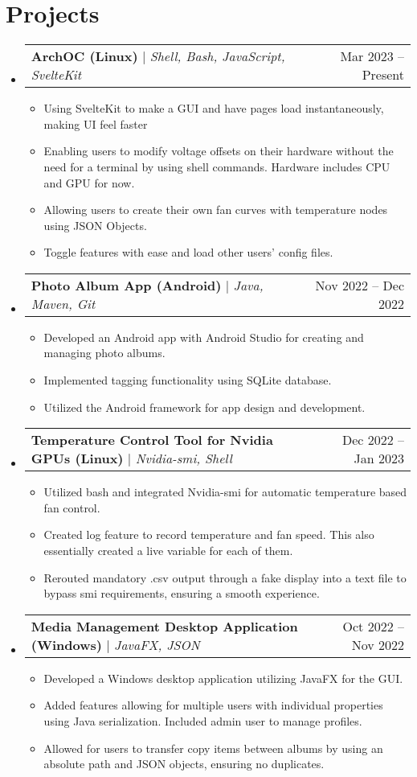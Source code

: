 \documentclass[letterpaper,12pt]{article}
\makeatletter
\newcommand{\resumeItem}[1]{
  \item\small{
    {#1 \vspace{-2pt}}
  }
}
\newcommand{\resumeProjectHeading}[2]{
    \item
    \begin{tabular*}{0.97\textwidth}{l@{\extracolsep{\fill}}r}
      \small#1 & #2 \\
    \end{tabular*}\vspace{-7pt}
}
\newcommand{\resumeSubHeadingListStart}{\begin{itemize}[leftmargin=0.15in, label={}]}
\newcommand{\resumeSubHeadingListEnd}{\end{itemize}}
\newcommand{\resumeItemListStart}{\begin{itemize}}
\newcommand{\resumeItemListEnd}{\end{itemize}\vspace{-5pt}}
\makeatother
\begin{document}
\section{Projects}
    \resumeSubHeadingListStart
      \resumeProjectHeading
          {\textbf{ArchOC (Linux)} $|$ \emph{Shell, Bash, JavaScript, SvelteKit}}{Mar 2023 -- Present}
          \resumeItemListStart
            \resumeItem{Using SvelteKit to make a GUI and have pages load instantaneously, making UI feel faster}
            \resumeItem{Enabling users to modify voltage offsets on their hardware without the need for a terminal by using shell commands. Hardware includes CPU and GPU for now.}
            \resumeItem{Allowing users to create their own fan curves with temperature nodes using JSON Objects.}
            \resumeItem{Toggle features with ease and load other users’ config files.}
          \resumeItemListEnd
      \resumeProjectHeading
          {\textbf{Photo Album App (Android)} $|$ \emph{Java, Maven, Git}}{Nov 2022 -- Dec 2022}
          \resumeItemListStart
            \resumeItem{Developed an Android app with Android Studio for creating and managing photo albums.}
            \resumeItem{Implemented tagging functionality using SQLite database.}
            \resumeItem{Utilized the Android framework for app design and development.}
          \resumeItemListEnd
     \resumeProjectHeading
          {\textbf{Temperature Control Tool for Nvidia GPUs (Linux)} $|$ \emph{Nvidia-smi, Shell}}{Dec 2022 -- Jan 2023}
          \resumeItemListStart
            \resumeItem{Utilized bash and integrated Nvidia-smi for automatic temperature based fan control.}
            \resumeItem{Created log feature to record temperature and fan speed. This also essentially created a live variable for each of them.}
            \resumeItem{Rerouted mandatory .csv output through a fake display into a text file to bypass smi requirements, ensuring a smooth experience.}
          \resumeItemListEnd
    \resumeProjectHeading
          {\textbf{Media Management Desktop Application (Windows)} $|$ \emph{JavaFX, JSON}}{Oct 2022 -- Nov 2022}
          \resumeItemListStart
            \resumeItem{Developed a Windows desktop application utilizing JavaFX for the GUI.}
            \resumeItem{Added features allowing for multiple users with individual properties using Java serialization. Included admin user to manage profiles.}
            \resumeItem{Allowed for users to transfer copy items between albums by using an absolute path and JSON objects, ensuring no duplicates.}
          \resumeItemListEnd
    \resumeSubHeadingListEnd



%



\end{document}
